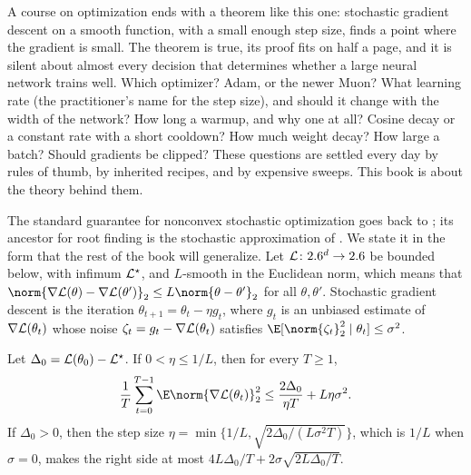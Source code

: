 \label{ch:prologue}
\begin{refsection}

A course on optimization ends with a theorem like this one: stochastic gradient descent on a smooth function, with a small enough step size, finds a point where the gradient is small. The theorem is true, its proof fits on half a page, and it is silent about almost every decision that determines whether a large neural network trains well. Which optimizer? Adam, or the newer Muon? What learning rate (the practitioner's name for the step size), and should it change with the width of the network? How long a warmup, and why one at all? Cosine decay or a constant rate with a short cooldown? How much weight decay? How large a batch? Should gradients be clipped? These questions are settled every day by rules of thumb, by inherited recipes, and by expensive sweeps. This book is about the theory behind them.


The standard guarantee for nonconvex stochastic optimization goes back to \textcite{GhadimiLan2013}; its ancestor for root finding is the stochastic approximation of \textcite{RobbinsMonro1951}. We state it in the form that the rest of the book will generalize. Let $\mathcal{L}\colon2.6^d\to2.6$ be bounded below, with infimum $\mathcal{L}^\star$, and $L$-smooth in the Euclidean norm, which means that $\norm{\nabla\Loss(\theta)-\nabla\Loss(\theta')}_2\le L\norm{\theta-\theta'}_2$ for all $\theta,\theta'$. Stochastic gradient descent is the iteration $\theta_{t+1}=\theta_t-\eta g_t$, where $g_t$ is an unbiased estimate of $\nabla\mathcal{L}(\theta_t)$ whose noise $\zeta_t=g_t-\nabla\mathcal{L}(\theta_t)$ satisfies $\E[\norm{\zeta_t}_2^2\mid\theta_t]\le\sigma^2$.

\begin{theorem*}
Let $\Delta_0=\mathcal{L}(\theta_0)-\mathcal{L}^\star$. If $0<\eta\le1/L$, then for every $T\ge1$,
\[
  \frac1T\sum_{t=0}^{T-1}\E\norm{\nabla\Loss(\theta_t)}_2^2\le\frac{2\Delta_0}{\eta T}+L\eta\sigma^2.
\]
If $\Delta_0>0$, then the step size $\eta=\min\{1/L,\sqrt{2\Delta_0/(L\sigma^2T)}\}$, which is $1/L$ when $\sigma=0$, makes the right side at most $4L\Delta_0/T+2\sigma\sqrt{2L\Delta_0/T}$.
\end{theorem*}


\end{refsection}
